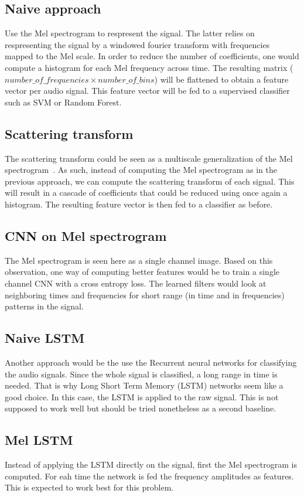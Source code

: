 \documentclass[10pt]{article}
\begin{document}
        \subsection*{Naive approach}
            Use the Mel spectrogram to respresent the signal.
            The latter relies on respresenting the signal by a windowed fourier transform with frequencies mapped to the Mel scale.
            In order to reduce the number of coefficients, one would compute a histogram for each Mel frequency across time.
            The resulting matrix (\(number\_of\_frequencies \times number\_of\_bins\)) will be flattened to obtain a feature vector per audio signal.
            This feature vector will be fed to a supervised classifier such as SVM or Random Forest.
        
        \subsection*{Scattering transform}
            The scattering transform could be seen as a multiscale generalization of the Mel spectrogram~\cite{anden2011multiscale}.
            As such, instead of computing the Mel spectrogram as in the previous approach, we can compute the scattering transform of each signal.
            This will result in a cascade of coefficients that could be reduced using once again a histogram.
            The resulting feature vector is then fed to a classifier as before.

        \subsection*{CNN on Mel spectrogram}
            The Mel spectrogram is seen here as a single channel image.
            Based on this observation, one way of computing better features would be to train a single channel CNN with a cross entropy loss.
            The learned filters would look at neighboring times and frequencies for short range (in time and in frequencies) patterns in the signal.

        \subsection*{Naive LSTM}
            Another approach would be the use the Recurrent neural networks for classifying the audio signals.
            Since the whole signal is classified, a long range in time is needed.
            That is why Long Short Term Memory (LSTM) networks seem like a good choice.
            In this case, the LSTM is applied to the raw signal.
            This is not supposed to work well but should be tried nonetheless as a second baseline.
        
        \subsection*{Mel LSTM}
            Instead of applying the LSTM directly on the signal, first the Mel spectrogram is computed.
            For eah time the network is fed the frequency amplitudes as features.
            This is expected to work best for this problem.

    
    
\end{document}
